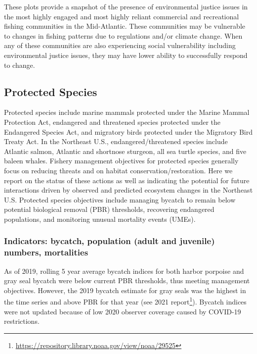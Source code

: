 \documentclass[
  10pt,
]{article}
\begin{document}
These plots provide a snapshot of the presence of environmental justice
issues in the most highly engaged and most highly reliant commercial and
recreational fishing communities in the Mid-Atlantic. These communities
may be vulnerable to changes in fishing patterns due to regulations
and/or climate change. When any of these communities are also
experiencing social vulnerability including environmental justice
issues, they may have lower ability to successfully respond to change.

\hypertarget{protected-species}{%
\subsection{Protected Species}\label{protected-species}}

Protected species include marine mammals protected under the Marine
Mammal Protection Act, endangered and threatened species protected under
the Endangered Species Act, and migratory birds protected under the
Migratory Bird Treaty Act. In the Northeast U.S., endangered/threatened
species include Atlantic salmon, Atlantic and shortnose sturgeon, all
sea turtle species, and five baleen whales. Fishery management
objectives for protected species generally focus on reducing threats and
on habitat conservation/restoration. Here we report on the status of
these actions as well as indicating the potential for future
interactions driven by observed and predicted ecosystem changes in the
Northeast U.S. Protected species objectives include managing bycatch to
remain below potential biological removal (PBR) thresholds, recovering
endangered populations, and monitoring unusual mortality events (UMEs).

\hypertarget{indicators-bycatch-population-adult-and-juvenile-numbers-mortalities}{%
\subsubsection{Indicators: bycatch, population (adult and juvenile)
numbers,
mortalities}\label{indicators-bycatch-population-adult-and-juvenile-numbers-mortalities}}

As of 2019, rolling 5 year average bycatch indices for both harbor
porpoise and gray seal bycatch were below current PBR thresholds, thus
meeting management objectives. However, the 2019 bycatch estimate for
gray seals was the highest in the time series and above PBR for that
year (see 2021 report\footnote{\url{https://repository.library.noaa.gov/view/noaa/29525}}).
Bycatch indices were not updated because of low 2020 observer coverage
caused by COVID-19 restrictions.
\end{document}
